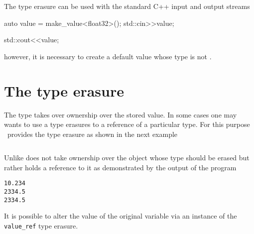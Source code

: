 The  type erasure can be used with the standard C++ input and output
streams
\begin{cppcode}
auto value = make_value<float32>();
std::cin>>value;

std::cout<<value;
\end{cppcode}
however, it is necessary to create a default value whose type is not
.

\section{The  type erasure}

The  type takes over ownership over the stored value. 
In some cases one may wants to use a type erasures to a reference of a
particular type.  For this purpose \libpnicore\ provides the 
type erasure as shown in the next example

\inputminted[fontsize=\small,
             linenos,
             firstnumber=26,
             firstline=26,
             lastline=45,
             frame=lines,
             label=examples/type\_erasure2.cpp]
{cpp}{../examples/type_erasure2.cpp}
Unlike   does not take ownership over the object
whose type should be erased but rather holds a reference to it
as demonstrated by the output of the program
\begin{verbatim}
10.234
2334.5
2334.5
\end{verbatim}
It is possible to alter the value of the original variable via an instance of
the {\tt value\_ref} type erasure.


